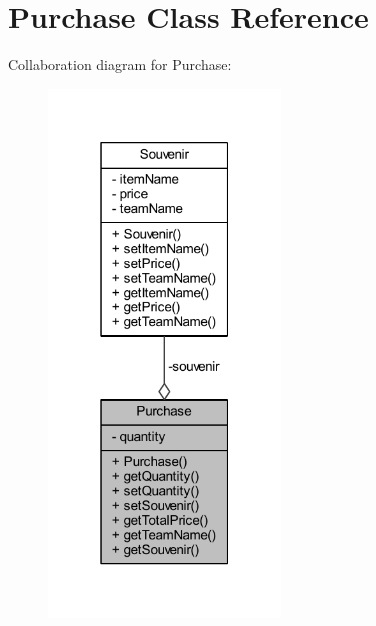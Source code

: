 \hypertarget{class_purchase}{}\section{Purchase Class Reference}
\label{class_purchase}


Collaboration diagram for Purchase\+:\nopagebreak
\begin{figure}[H]
\begin{center}
\leavevmode
\includegraphics[width=175pt]{class_purchase__coll__graph}
\end{center}
\end{figure}

